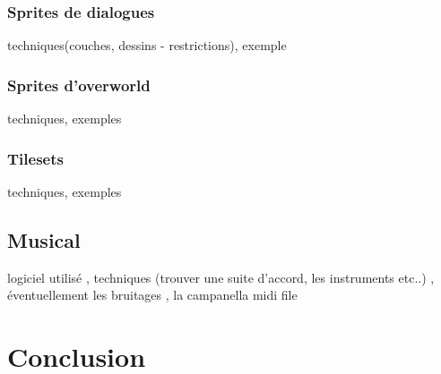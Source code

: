 \documentclass[11pt]{article}
\begin{document}
\subsubsection{Sprites de dialogues}
techniques(couches, dessins - restrictions), exemple 
\subsubsection{Sprites d'overworld}
techniques, exemples
\subsubsection{Tilesets}
techniques, exemples
\subsection{Musical}
logiciel utilisé , techniques (trouver une suite d'accord, les instruments etc..) , éventuellement les bruitages , la campanella midi file
\section{Conclusion}
\end{document}
